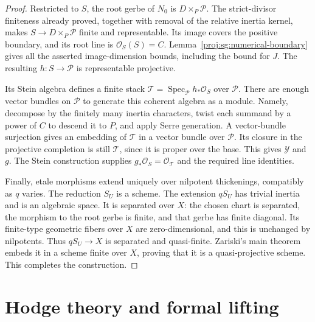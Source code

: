 \documentclass[11pt,letterpaper]{article}
\theoremstyle{definition}
\theoremstyle{remark}
\begin{document}
\begin{proof}
Restricted to $S$, the root gerbe of $N_0$ is
$D\times_P\mathcal P$.  The strict-divisor finiteness already
proved, together with removal of the relative inertia kernel,
makes $S\to D\times_P\mathcal P$ finite and representable.
Its image covers the positive boundary, and its root line is
$\mathcal{O}_S(S)=C$.  Lemma~\ref{proj:sg:numerical-boundary} gives all the
asserted image-dimension bounds, including the bound for $J$.
The resulting $h:S\to\mathcal P$ is representable projective.

Its Stein algebra defines a finite stack
$\mathcal T=\operatorname{Spec}_{\mathcal P}h_*\mathcal{O}_S$ over $\mathcal P$.
There are enough vector bundles on $\mathcal P$ to generate
this coherent algebra as a module.  Namely, decompose by the
finitely many inertia characters, twist each summand by a
power of $C$ to descend it to $P$, and apply Serre generation.
A vector-bundle surjection gives an embedding of $\mathcal T$
in a vector bundle over $\mathcal P$.  Its closure in the
projective completion is still $\mathcal T$, since it is
proper over the base.  This gives $\mathcal Y$ and $g$.
The Stein construction supplies $g_*\mathcal{O}_S=\mathcal{O}_{\mathcal T}$
and the required line identities.

Finally, etale morphisms extend uniquely over nilpotent
thickenings, compatibly as $q$ varies.  The reduction $S_U$
is a scheme.  The extension $qS_U$ has trivial inertia and
is an algebraic space.  It is separated over $X$: the chosen
chart is separated, the morphism to the root gerbe is finite,
and that gerbe has finite diagonal.  Its finite-type
geometric fibers over $X$ are zero-dimensional, and this is
unchanged by nilpotents.  Thus $qS_U\to X$ is separated and
quasi-finite.  Zariski's main theorem embeds it in a scheme
finite over $X$, proving that it is a quasi-projective
scheme.  This completes the construction.
\end{proof}

\section{Hodge theory and formal lifting}\label{proj:sec:hodge}
\end{document}
